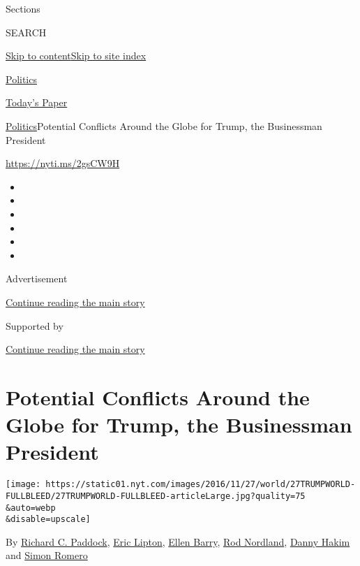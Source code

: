 Sections

SEARCH

\protect\hyperlink{site-content}{Skip to
content}\protect\hyperlink{site-index}{Skip to site index}

\href{https://www.nytimes.com/section/politics}{Politics}

\href{https://myaccount.nytimes.com/auth/login?response_type=cookie\&client_id=vi}{}

\href{https://www.nytimes.com/section/todayspaper}{Today's Paper}

\href{/section/politics}{Politics}\textbar{}Potential Conflicts Around
the Globe for Trump, the Businessman President

\url{https://nyti.ms/2gsCW9H}

\begin{itemize}
\item
\item
\item
\item
\item
\item
\end{itemize}

Advertisement

\protect\hyperlink{after-top}{Continue reading the main story}

Supported by

\protect\hyperlink{after-sponsor}{Continue reading the main story}

\hypertarget{potential-conflicts-around-the-globe-for-trump-the-businessman-president}{%
\section{Potential Conflicts Around the Globe for Trump, the Businessman
President}\label{potential-conflicts-around-the-globe-for-trump-the-businessman-president}}

\texttt{[image: https://static01.nyt.com/images/2016/11/27/world/27TRUMPWORLD-FULLBLEED/27TRUMPWORLD-FULLBLEED-articleLarge.jpg?quality=75\\\&auto=webp\\\&disable=upscale]}

By \href{https://www.nytimes.com/by/richard-c-paddock}{Richard C.
Paddock}, \href{http://www.nytimes.com/by/eric-lipton}{Eric Lipton},
\href{https://www.nytimes.com/by/ellen-barry}{Ellen Barry},
\href{http://www.nytimes.com/by/rod-nordland}{Rod Nordland},
\href{http://www.nytimes.com/by/danny-hakim}{Danny Hakim} and
\href{http://www.nytimes.com/by/simon-romero}{Simon Romero}

